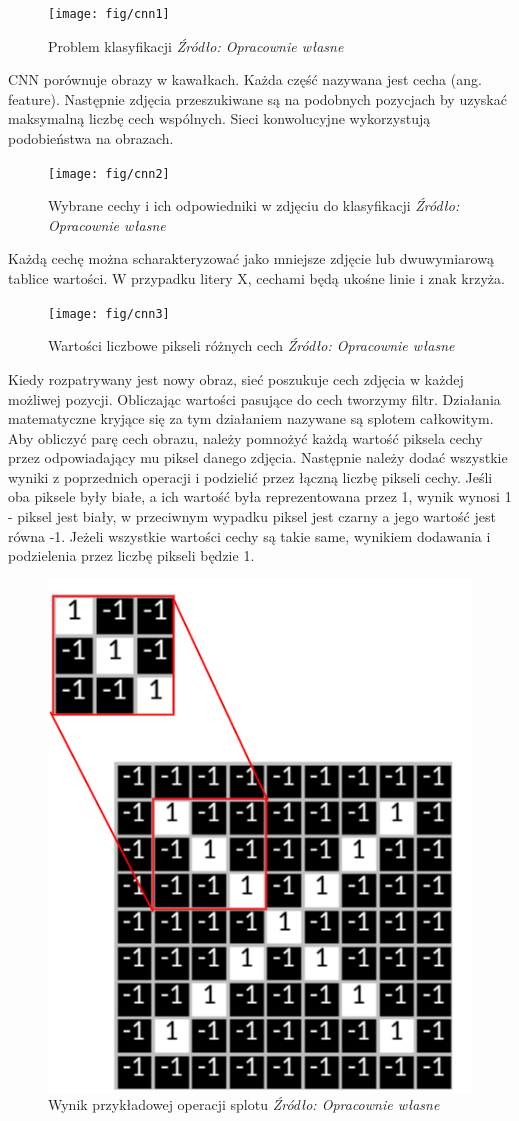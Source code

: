 \documentclass[brudnopis]{xmgr}
\begin{document}
\begin{figure}[!tbh]
\centering
\texttt{[image: fig/cnn1]}
\caption{Problem klasyfikacji \emph{Źródło: Opracownie własne}}
\end{figure}

CNN porównuje obrazy w kawałkach. Każda część nazywana jest cecha (ang. feature). Następnie zdjęcia przeszukiwane są na podobnych pozycjach by uzyskać maksymalną liczbę cech wspólnych. Sieci konwolucyjne wykorzystują podobieństwa na obrazach.

\begin{figure}[!tbh]
\centering
\texttt{[image: fig/cnn2]}
\caption{Wybrane cechy i ich odpowiedniki w zdjęciu do klasyfikacji \emph{Źródło: Opracownie własne}}
\end{figure}
\raggedbottom

Każdą cechę można scharakteryzować jako mniejsze zdjęcie lub dwuwymiarową tablice wartości. W przypadku litery X, cechami będą ukośne linie i znak krzyża.

\begin{figure}[!tbh]
\centering
\texttt{[image: fig/cnn3]}
\caption{Wartości liczbowe pikseli różnych cech \emph{Źródło: Opracownie własne}}
\end{figure}

Kiedy rozpatrywany jest nowy obraz, sieć poszukuje cech zdjęcia w każdej możliwej pozycji. Obliczając wartości pasujące do cech tworzymy filtr. Działania matematyczne kryjące się za tym działaniem nazywane są splotem całkowitym. Aby obliczyć parę cech obrazu, należy pomnożyć każdą wartość piksela cechy przez odpowiadający mu piksel danego zdjęcia. Następnie należy dodać wszystkie wyniki z poprzednich operacji i podzielić przez łączną liczbę pikseli cechy. Jeśli oba piksele były białe, a ich wartość była reprezentowana przez 1, wynik wynosi 1 - piksel jest biały, w przeciwnym wypadku piksel jest czarny a jego wartość jest równa -1. Jeżeli wszystkie wartości cechy są takie same, wynikiem dodawania i podzielenia przez liczbę pikseli będzie 1.
\newpage

\begin{figure}[!tbh]
\centering
\includegraphics[width=.5\hsize]{fig/cnn4}
\caption{Wynik przykładowej operacji splotu \emph{Źródło: Opracownie własne}}
\end{figure}
\end{document}
